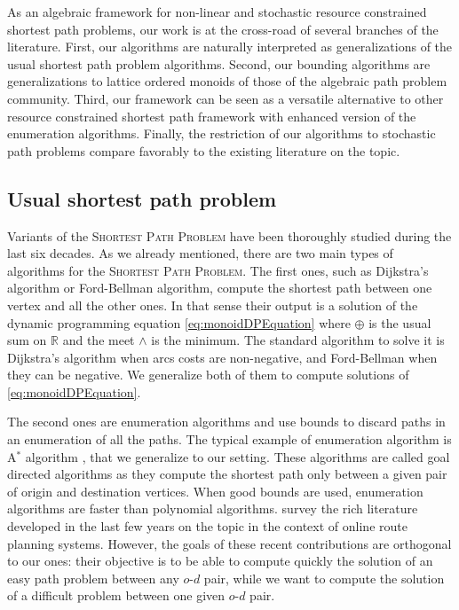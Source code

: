\documentclass[11pt]{amsart}
\theoremstyle{plain}
\theoremstyle{remark}
\def\R{\mathbb{R}}
\newcommand{\SP}{\textsc{Shortest Path Problem}\xspace}
\newcommand{\rplus}{\oplus}
\newcommand{\meet}{\wedge} \newcommand{\bigmeet}{\bigwedge}
\begin{document}
As an algebraic framework for non-linear and stochastic resource constrained shortest path problems, our work is at the cross-road of several branches of the literature. First, our algorithms are naturally interpreted as generalizations of the usual shortest path problem algorithms. Second, our bounding algorithms are generalizations to lattice ordered monoids of those of the algebraic path problem community. Third, our framework can be seen as a versatile alternative to other resource constrained shortest path framework with enhanced version of the enumeration algorithms. Finally, the restriction of our algorithms to stochastic path problems compare favorably to the existing literature on the topic.

\subsection{Usual shortest path problem} \label{sub:usual_shortest_path_problem}

Variants of the \SP have been thoroughly studied during the last six decades. As we already mentioned, there are two main types of algorithms for the \SP. The first ones, such as Dijkstra's algorithm or Ford-Bellman algorithm, compute the shortest path between one vertex and all the other ones. In that sense their output is a solution of the dynamic programming equation \eqref{eq:monoidDPEquation} where $\rplus$ is the usual sum on $\R$ and the meet $\meet$ is the minimum. The standard algorithm to solve it is Dijkstra's algorithm \cite{dijkstra1959note} when arcs costs are non-negative, and Ford-Bellman \cite{ford1956maximal,bellman1958routing} when they can be negative. We generalize both of them to compute solutions of \eqref{eq:monoidDPEquation}.

The second ones are enumeration algorithms and use bounds to discard paths in an enumeration of all the paths. The typical example of enumeration algorithm is A$^{*}$ algorithm \cite{hart1968formal}, that we generalize to our setting. These algorithms are called goal directed algorithms as they compute the shortest path only between a given pair of origin and destination vertices. When good bounds are used, enumeration algorithms are faster than polynomial algorithms. \citet{bast2014route} survey the rich literature developed in the last few years on the topic in the context of online route planning systems. However, the goals of these recent contributions are orthogonal to our ones: their objective is to be able to compute quickly the solution of an easy path problem between any $o$-$d$ pair, while we want to compute the solution of a  difficult problem between one given $o$-$d$ pair.
\end{document}
